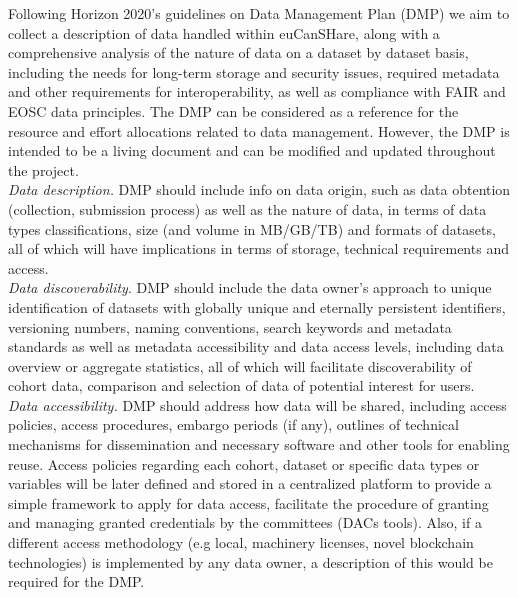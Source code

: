 \documentclass{article}
\begin{document}
Following Horizon 2020's guidelines on Data Management Plan (DMP) we aim to collect a description of data handled within euCanSHare, along with a comprehensive analysis of the nature of data on a dataset by dataset basis, including the needs for long-term storage and security issues, required metadata and other requirements for interoperability, as well as compliance with FAIR and EOSC data principles. The DMP can be considered as a reference for the resource and effort allocations related to data management. However, the DMP is intended to be a living document and can be modified and updated throughout the project.\\


\textit{Data description.}
DMP should include info on data origin, such as data obtention (collection, submission process) as well as the nature of data, in terms of data types classifications, size (and volume in MB/GB/TB) and formats of datasets, all of which will have implications in terms of storage, technical requirements and access. \\


\textit{Data discoverability}. DMP should include the data owner's approach to unique identification of datasets with globally unique and eternally persistent identifiers, versioning numbers, naming conventions, search keywords and metadata standards as well as metadata accessibility and data access levels, including data overview or aggregate statistics, all of which will facilitate discoverability of cohort data, comparison and selection of data of potential interest for users. \\


\textit{Data accessibility.} DMP should address how data will be shared, including access policies, access procedures, embargo periods (if any), outlines of technical mechanisms for dissemination and necessary software and other tools for enabling reuse. Access policies regarding each cohort, dataset or specific data types or variables will be later defined and stored in a centralized platform to provide a simple framework to apply for data access, facilitate the procedure of granting and managing granted credentials by the committees (DACs tools). Also, if a different access methodology (e.g local, machinery licenses, novel blockchain technologies) is implemented by any data owner, a description of this would be required for the DMP.\\
\end{document}
